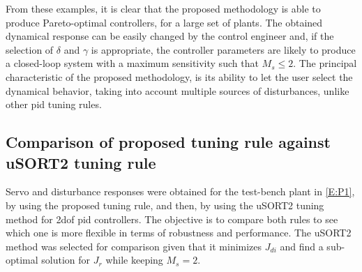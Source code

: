 From these examples, it is clear that the proposed methodology is able to produce Pareto-optimal controllers, for a large set of plants. The obtained dynamical response can be easily changed by the control engineer and, if the selection of $\delta$ and $\gamma$ is appropriate, the controller parameters are likely to produce a closed-loop system with a maximum sensitivity such that $M_s \leq 2$. The principal characteristic of the proposed methodology, is its ability to let the user select the dynamical behavior, taking into account multiple sources of disturbances, unlike other \gls{pid} tuning rules.

\subsection{Comparison of proposed tuning rule against uSORT2 tuning rule}
%
Servo and disturbance responses were obtained for the test-bench plant in \eqref{E:P1}, by using the proposed tuning rule, and then, by using the uSORT2 tuning method for \gls{2dof} \gls{pid} controllers. The objective is to compare both rules to see which one is more flexible in terms of robustness and performance. The uSORT2 method was selected for comparison given that it minimizes $J_{di}$ and find a sub-optimal solution for $J_r$ while keeping $M_s=2$.
%

